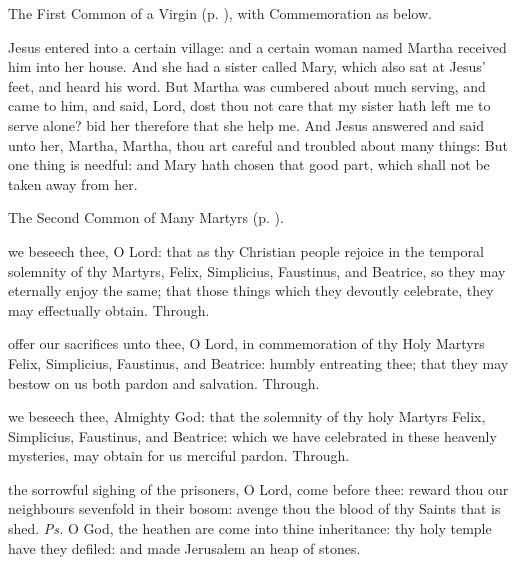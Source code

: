 
\begin{rubric}
	The First Common of a Virgin (p. \pageref{CommonVirginOnlyI}), with Commemoration  as below.
\end{rubric}

 Jesus entered into a certain village: and a certain woman named Martha received him into her house. And she had a sister called Mary, which also sat at Jesus' feet, and heard his word. But Martha was cumbered about much serving, and came to him, and said, Lord, dost thou not care that my sister hath left me to serve alone? bid her therefore that she help me. And Jesus answered and said unto her, Martha, Martha, thou art careful and troubled about many things: But one thing is needful: and Mary hath chosen that good part, which shall not be taken away from her.



\begin{rubric}
	The Second Common of Many Martyrs (p. \pageref{CommonMartyrsII}).
\end{rubric}

\collect
{} we beseech thee, O Lord: that as thy Christian people rejoice in the temporal solemnity of thy Martyrs, Felix, Simplicius, Faustinus, and Beatrice, so they may eternally enjoy the same; that those things which they devoutly celebrate, they may effectually obtain. Through.

\secret
{} offer our sacrifices unto thee, O Lord, in commemoration of thy Holy Martyrs Felix, Simplicius, Faustinus, and Beatrice: humbly entreating thee; that they may bestow on us both pardon and salvation. Through.

\postcommunion
{} we beseech thee, Almighty God: that the solemnity of thy holy Martyrs Felix, Simplicius, Faustinus, and Beatrice: which we have celebrated in these heavenly mysteries, may obtain for us merciful pardon. Through.



\introit
{} the sorrowful sighing of the prisoners, O Lord, come before thee: reward thou our neighbours sevenfold in their bosom: avenge thou the blood of thy Saints that is shed. \textit{Ps.} O God, the heathen are come into thine inheritance: thy holy temple have they defiled: and made Jerusalem an heap of stones.

